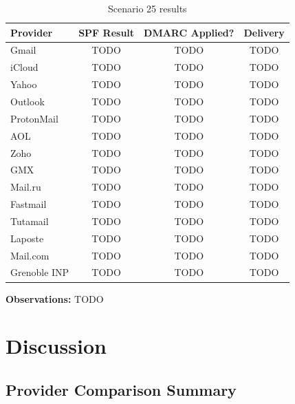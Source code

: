 \documentclass[11pt,a4paper]{article}
\begin{document}
\begin{table}[h]
\centering
\small
\begin{tabular}{lccc}
\toprule
\textbf{Provider} & \textbf{SPF Result} & \textbf{DMARC Applied?} & \textbf{Delivery} \\
\midrule
Gmail & TODO & TODO & TODO \\
iCloud & TODO & TODO & TODO \\
Yahoo & TODO & TODO & TODO \\
Outlook & TODO & TODO & TODO \\
ProtonMail & TODO & TODO & TODO \\
AOL & TODO & TODO & TODO \\
Zoho & TODO & TODO & TODO \\
GMX & TODO & TODO & TODO \\
Mail.ru & TODO & TODO & TODO \\
Fastmail & TODO & TODO & TODO \\
Tutamail & TODO & TODO & TODO \\
Laposte & TODO & TODO & TODO \\
Mail.com & TODO & TODO & TODO \\
Grenoble INP & TODO & TODO & TODO \\
\bottomrule
\end{tabular}
\caption{Scenario 25 results}
\end{table}

\textbf{Observations:} TODO

\section{Discussion}

\subsection{Provider Comparison Summary}
\end{document}
